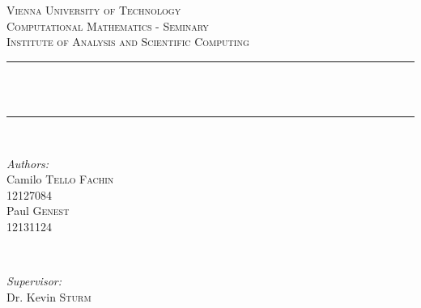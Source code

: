 \begin{titlepage}

\newcommand{\HRule}{\rule{\linewidth}{0.5mm}} %

\center %
 

\textsc{\LARGE Vienna University of Technology}\\[1.5cm] %
\textsc{\Large Computational Mathematics - Seminary}\\[0.5cm] %
\textsc{\large Institute of Analysis and Scientific Computing }\\[0.5cm] %


\HRule \\[0.5cm]
{ \huge \bfseries \doctitle}\\[1mm] %
\HRule \\[0.5cm]
 

\begin{minipage}{0.4\textwidth}
\begin{flushleft} \large
\emph{Authors:}\\
Camilo \textsc{Tello Fachin}\\
12127084 \\
\vspace{3mm}
Paul \textsc{Genest}\\
12131124 \\

\end{flushleft}
\end{minipage}
~
\begin{minipage}{0.4\textwidth}
\begin{flushright} \large
\emph{Supervisor:} \\
Dr. Kevin \textsc{Sturm} \\ %
\end{flushright}
\end{minipage}\\[1.5cm]


\end{titlepage}
